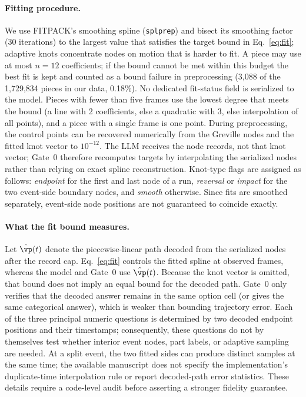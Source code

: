 \paragraph{Fitting procedure.}
We use FITPACK's smoothing spline (\texttt{splprep}) and bisect its smoothing factor (30 iterations) to the largest value that satisfies the target bound in Eq.~\ref{eq:fit}; adaptive knots concentrate nodes on motion that is harder to fit.
A piece may use at most $n=12$ coefficients; if the bound cannot be met within this budget the best fit is kept and counted as a bound failure in preprocessing (3,088 of the 1,729,834 pieces in our data, 0.18\%). No dedicated fit-status field is serialized to the model.
Pieces with fewer than five frames use the lowest degree that meets the bound (a line with 2 coefficients, else a quadratic with 3, else interpolation of all points), and a piece with a single frame is one point.
During preprocessing, the control points can be recovered numerically from the Greville nodes and the fitted knot vector to $10^{-12}$. The LLM receives the node records, not that knot vector; Gate~0 therefore recomputes targets by interpolating the serialized nodes rather than relying on exact spline reconstruction.
Knot-type flags are assigned as follows: \emph{endpoint} for the first and last node of a run, \emph{reversal} or \emph{impact} for the two event-side boundary nodes, and \emph{smooth} otherwise. Since fits are smoothed separately, event-side node positions are not guaranteed to coincide exactly.

\paragraph{What the fit bound measures.}
Let $\hat{\vp}(t)$ denote the piecewise-linear path decoded from the serialized nodes after the record cap. Eq.~\ref{eq:fit} controls the fitted spline at observed frames, whereas the model and Gate~0 use $\hat{\vp}(t)$. Because the knot vector is omitted, that bound does not imply an equal bound for the decoded path. Gate~0 only verifies that the decoded answer remains in the same option cell (or gives the same categorical answer), which is weaker than bounding trajectory error. Each of the three principal numeric questions is determined by two decoded endpoint positions and their timestamps; consequently, these questions do not by themselves test whether interior event nodes, part labels, or adaptive sampling are needed. At a split event, the two fitted sides can produce distinct samples at the same time; the available manuscript does not specify the implementation's duplicate-time interpolation rule or report decoded-path error statistics. These details require a code-level audit before asserting a stronger fidelity guarantee.


